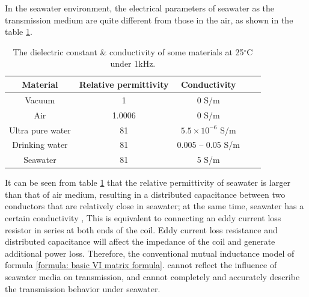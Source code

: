 In the seawater environment, the electrical parameters of seawater as the transmission medium are quite different from those in the air, as shown in the table \ref{table:permittivity}. 
\begin{table}[htbp]
    \centering
    \caption{The dielectric constant \& conductivity of some materials at 25$^\circ$C under 1kHz.}
    \begin{tabular}{ |c|c|c|m{3.5cm}<{\centering}|m{3.5cm}<{\centering}| }
        \hline
        \textbf{Material} & \textbf{Relative permittivity} & \textbf{Conductivity}    \\\hline
        Vacuum            & 1                              & 0 S/m                    \\ \hline
        Air               & 1.0006                         & 0 S/m                    \\ \hline
        Ultra pure water  & 81                             & $5.5 \times 10^{-6}$ S/m \\ \hline
        Drinking water    & 81                             & 0.005 – 0.05 S/m         \\ \hline
        Seawater          & 81                             & 5 S/m                    \\ \hline
    \end{tabular}
    \label{table:permittivity}
\end{table}

It can be seen from table \ref{table:permittivity} that the relative permittivity of seawater is larger than that of air medium, resulting in a distributed capacitance between two conductors that are relatively close in seawater; at the same time, seawater has a certain conductivity , This is equivalent to connecting an eddy current loss resistor in series at both ends of the coil. Eddy current loss resistance and distributed capacitance will affect the impedance of the coil and generate additional power loss. Therefore, the conventional mutual inductance model of formula \ref{formula: basic VI matrix formula}. cannot reflect the influence of seawater media on transmission, and cannot completely and accurately describe the transmission behavior under seawater.


